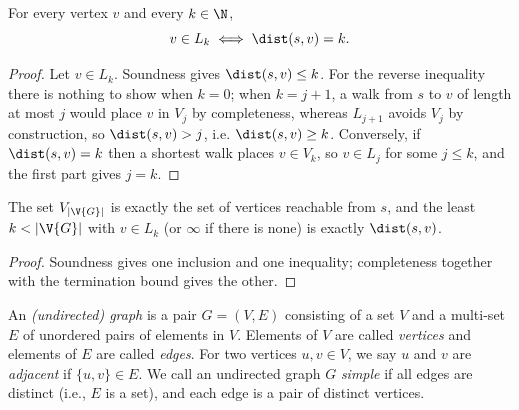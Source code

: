 \begin{theorem}
  \label{thm:bfs-layers-spheres}
  \leanok
  For every vertex $v$ and every $k \in \N$,
  \[
    v \in L_k \iff \dist(s, v) = k .
  \]
\end{theorem}
\begin{proof}
  \leanok
  Let $v \in L_k$. Soundness gives $\dist(s, v) \le k$. For the reverse inequality there
  is nothing to show when $k = 0$; when $k = j + 1$, a walk from $s$ to $v$ of length at
  most $j$ would place $v$ in $V_j$ by completeness, whereas $L_{j+1}$ avoids $V_j$ by
  construction, so $\dist(s, v) > j$, i.e. $\dist(s, v) \ge k$. Conversely, if
  $\dist(s, v) = k$ then a shortest walk places $v \in V_k$, so $v \in L_j$ for some
  $j \le k$, and the first part gives $j = k$.
\end{proof}

\begin{theorem}
  \label{thm:bfs-correct}
  \leanok
  The set $V_{|\V{G}|}$ is exactly the set of vertices reachable from $s$, and the least
  $k < |\V{G}|$ with $v \in L_k$ (or $\infty$ if there is none) is exactly $\dist(s, v)$.
\end{theorem}
\begin{proof}
  \leanok
  Soundness gives one inclusion and one inequality; completeness together with the
  termination bound gives the other.
\end{proof}


%


%


%


%


%
\begin{definition}
  An \textit{(undirected) graph} is a pair $G = (V,E)$ consisting of a set $V$ 
  and a multi-set $E$ of unordered pairs of elements in $V$. 
  Elements of $V$ are called \textit{vertices} and elements of $E$ are called \textit{edges}.
  For two vertices $u,v \in V$, we say $u$ and $v$ are \textit{adjacent} if $\{u,v\} \in E$.
  We call an undirected graph $G$ \textit{simple} if all edges are distinct (i.e., $E$ is a set), 
  and each edge is a pair of distinct vertices.
\end{definition}

